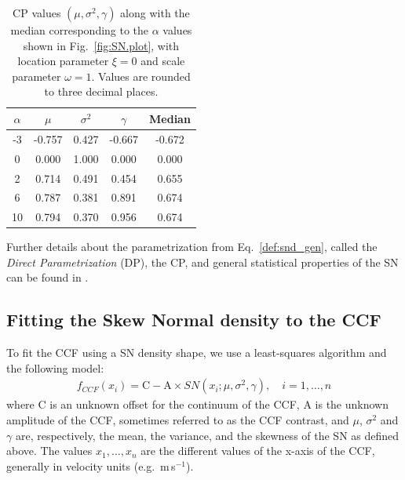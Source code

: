 \documentclass{aa}
\def\ms{\hbox{\,m\,s$^{-1}$}}         %
\begin{document}
\begin{table}[htbp]
\begin{center}
   \caption{CP values $(\mu, \sigma^2, \gamma)$ along with the median corresponding to the $\alpha$ values shown in Fig.~\ref{fig:SN.plot}, with location parameter $\xi = 0$ and scale parameter $\omega = 1$. Values are rounded to three decimal places.}
   \label{tab:cp_values}
   \begin{tabular}{|ccccc|} %
\hline
$\alpha$ & $\mu$ & $\sigma^2$ & $\gamma$  & Median \\
\hline
 -3 	&	 -0.757	&	 0.427	&	 -0.667  	& 	-0.672\\
0	&	 0.000 	&	1.000	&	 0.000 	& 	0.000\\
2	&	 0.714	&	 0.491	&	 0.454 	& 	0.655\\
6	&	 0.787	&	 0.381	&	 0.891 	& 	0.674\\
10	&	 0.794	&	 0.370	&	 0.956 	& 	0.674\\
\hline
   \end{tabular}

\end{center}
\end{table}
%
Further details about the parametrization from Eq.~\eqref{def:snd_gen}, called the \textit{Direct Parametrization} (DP), the CP, and general statistical properties of the SN can be found in \cite{Azzalini2014}.

\subsection{Fitting the Skew Normal density to the CCF} \label{sec:3}

To fit the CCF using a SN density shape, we use a least-squares algorithm and the following model:
%
\begin{eqnarray} \label{eq:3}
f_{CCF}(x_i) = \mathrm{C} - \mathrm{A} \times SN(x_i;\mu, \sigma^2, \gamma), \quad i = 1, \ldots, n
\end{eqnarray}
%
where C is an unknown offset for the continuum of the CCF, A is the unknown amplitude of the CCF, sometimes referred to as the CCF contrast, and $\mu$, $\sigma^2$ and $\gamma$ are, respectively, the mean, the variance, and the skewness of the SN as defined above.
The values $x_1, \ldots, x_n$ are the different values of the x-axis of the CCF, generally in velocity units (e.g. \ms).
\end{document}
